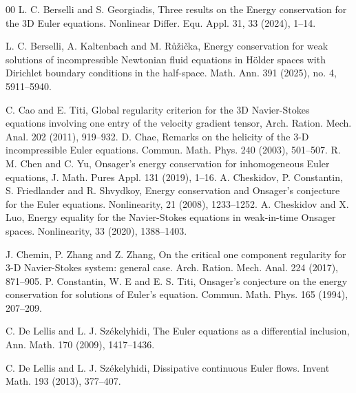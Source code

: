 \documentclass[11pt]{article}
\theoremstyle{plain}\newtheorem{definition}{Definition}[section]
\theoremstyle{definition}\newtheorem{theorem}{Theorem}[section]
\theoremstyle{plain}\newtheorem{lemma}[theorem]{Lemma}
\theoremstyle{plain}\newtheorem{coro}[theorem]{Corollary}
\theoremstyle{plain}\newtheorem{prop}[theorem]{Proposition}
\theoremstyle{remark}\newtheorem{remark}{Remark}[section]
\numberwithin{equation}{section}
\begin{document}
\begin{thebibliography}{00}
\bibitem{[BG]} L. C. Berselli and S.  Georgiadis,  Three results on the Energy conservation for the 3D
Euler equations.  Nonlinear Differ. Equ. Appl. 31, 33 (2024), 1--14.


\bibitem{[BKR]}
 L. C. Berselli, A. Kaltenbach and M. R\r{u}\v{z}i\v{c}ka, Energy conservation for weak solutions of incompressible Newtonian fluid equations in H\"older spaces with Dirichlet boundary conditions in the half-space. Math. Ann. 391 (2025), no. 4, 5911--5940.



\bibitem{[CT]}
C. Cao and E. Titi, Global regularity criterion for the 3D Navier-Stokes equations
involving one entry of the velocity gradient tensor, Arch. Ration. Mech. Anal. 202
(2011), 919--932.
\bibitem{[Chae]}
D. Chae,  Remarks on the helicity of the 3-D incompressible Euler equations. Commun. Math. Phys. 240 (2003),
501--507.
\bibitem{[CY]}
 R. M. Chen and C. Yu, Onsager's energy conservation for inhomogeneous Euler equations, J. Math. Pures Appl. 131 (2019), 1--16.
\bibitem{[CCFS]}
A. Cheskidov,  P. Constantin, S. Friedlander and R. Shvydkoy, Energy conservation and Onsager's conjecture for the Euler equations. Nonlinearity, 21 (2008), 1233--1252.
\bibitem{[CL]}
   A. Cheskidov and X. Luo, Energy equality for the Navier-Stokes equations in weak-in-time Onsager spaces. Nonlinearity, 33 (2020), 1388--1403.




\bibitem{[CZZ]}
 J. Chemin, P. Zhang and Z. Zhang, On the critical one component regularity for 3-D
Navier-Stokes system: general case. Arch. Ration. Mech. Anal. 224 (2017), 871--905.
\bibitem{[CET]} P. Constantin,  W. E and   E. S. Titi,  Onsager's conjecture on the energy conservation for solutions of Euler's equation. Commun. Math. Phys. 165 (1994), 207--209.














\bibitem{[DS0]}
 C. De Lellis and  L.  J.  Sz\'ekelyhidi,
  The Euler equations as a differential inclusion,
Ann. Math. 170 (2009), 1417--1436.

\bibitem{[DS1]}
 C. De Lellis and  L.  J.  Sz\'ekelyhidi,   Dissipative continuous Euler flows. Invent Math. 193 (2013), 377--407.


\end{thebibliography}
\end{document}
